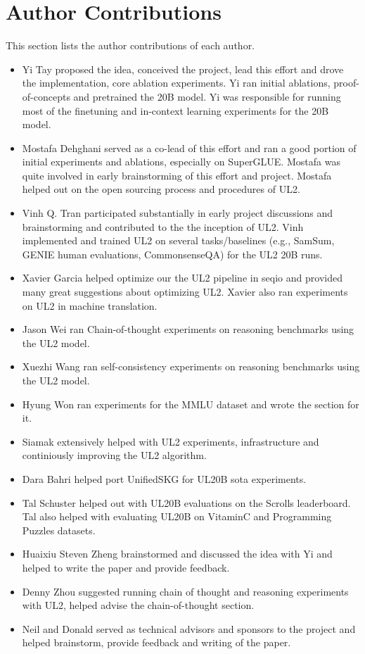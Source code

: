\documentclass[10pt]{article}
\begin{document}
\section{Author Contributions}
This section lists the author contributions of each author. 
\begin{itemize}
\item Yi Tay proposed the idea, conceived the project, lead this effort and drove the implementation, core ablation experiments. Yi ran initial ablations, proof-of-concepts and pretrained the 20B model. Yi was responsible for running most of the finetuning and in-context learning experiments for the 20B model. 

\item Mostafa Dehghani served as a co-lead of this effort and ran a good portion of initial experiments and ablations, especially on SuperGLUE. Mostafa was quite involved in early brainstorming of this effort and project. Mostafa helped out on the open sourcing process and procedures of UL2.

\item Vinh Q. Tran participated substantially in early project discussions and brainstorming and contributed to the the inception of UL2. Vinh implemented and trained UL2 on several tasks/baselines (e.g., SamSum, GENIE human evaluations, CommonsenseQA) for the UL2 20B runs. 

\item Xavier Garcia helped optimize our the UL2 pipeline in seqio and provided many great suggestions about optimizing UL2. Xavier also ran experiments on UL2 in machine translation. 
\item Jason Wei ran Chain-of-thought experiments on reasoning benchmarks using the UL2 model.
\item Xuezhi Wang ran self-consistency experiments on reasoning benchmarks using the UL2 model.
\item Hyung Won ran experiments for the MMLU dataset and wrote the section for it. 
\item Siamak extensively helped with UL2 experiments, infrastructure and continiously improving the UL2 algorithm.
\item Dara Bahri helped port UnifiedSKG for UL20B sota experiments. 
\item Tal Schuster helped out with UL20B evaluations on the Scrolls leaderboard. Tal also helped with evaluating UL20B on VitaminC and Programming Puzzles datasets.

\item Huaixiu Steven Zheng brainstormed and discussed the idea with Yi and helped to write the paper and provide feedback. 
\item Denny Zhou suggested running chain of thought and reasoning experiments with UL2, helped advise the chain-of-thought section. 
\item Neil and Donald served as technical advisors and sponsors to the project and helped brainstorm, provide feedback and writing of the paper. 
\end{itemize}
\end{document}
